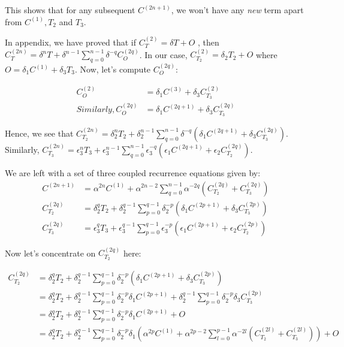 \documentclass[11pt,a4paper]{article}
\begin{document}
This shows that for any subsequent $C^{(2n+1)}$, we won't have any \textit{new} term apart from $C^{(1)},T_2$ and $T_3$. 

In appendix, we have proved that if $C^{(2)}_T=  \delta T + O$ , then $C^{(2n)}_T= \delta^{n} T +  \delta^{n-1} \sum_{q=0}^{n-1} \delta^{-q} C^{(2q)}_O  $. In our case,  $C^{(2)}_{T_2}=  \delta_2 T_2 + O $ where $O=\delta_1 C^{(1)} + \delta_3 T_3$. Now, let's compute $C^{(2q)}_O$:

\begin{align*}
C^{(2)}_O&=\delta_1 C^{(3)} + \delta_3  C^{(2)}_{T_3} \\
Similarly, C^{(2q)}_O&=\delta_1 C^{(2q+1)} + \delta_3  C^{(2q)}_{T_3} 
\end{align*}

Hence, we see that $C^{(2n)}_{T_2}= \delta_2^{n} T_2 +  \delta_2^{n-1} \sum_{q=0}^{n-1} \delta^{-q} (\delta_1 C^{(2q+1)} + \delta_3  C^{(2q)}_{T_3})  $. Similarly, $C^{(2n)}_{T_3}= \epsilon_3^{n} T_3 +  \epsilon_3^{n-1} \sum_{q=0}^{n-1}\epsilon_3^{-q} (\epsilon_1 C^{(2q+1)} + \epsilon_2  C^{(2q)}_{T_2})  $. 

We are left with a set of three coupled recurrence equations given by:
\begin{equation}
\boxed{
\begin{aligned}
C^{(2n+1)}&= \alpha^{2n} C^{(1)} +\alpha^{2n-2} \sum_{q=0}^{n-1} \alpha^{-2q} (C^{(2q)}_{T_2} + C^{(2q)}_{T_3}  ) \\
C^{(2q)}_{T_2} &= \delta^{q}_2 T_2 +  \delta_2^{q-1} \sum_{p=0}^{q-1} \delta_2^{-p}   (\delta_1 C^{(2p+1)} + \delta_3  C^{(2p)}_{T_3})\\
C^{(2q)}_{T_3} &= \epsilon_3^{q} T_3 +  \epsilon_3^{q-1} \sum_{p=0}^{q-1}\epsilon_3^{-p} (\epsilon_1 C^{(2p+1)} + \epsilon_2  C^{(2p)}_{T_2}) 
\end{aligned}
}
\end{equation}

Now let's concentrate on $C^{(2q)}_{T_2}$ here:

\begin{align}
C^{(2q)}_{T_2} &= \delta^{q}_2 T_2 +  \delta_2^{q-1} \sum_{p=0}^{q-1} \delta_2^{-p}   (\delta_1 C^{(2p+1)} + \delta_3  C^{(2p)}_{T_3})\\
 &= \delta^{q}_2 T_2 +  \delta_2^{q-1} \sum_{p=0}^{q-1} \delta_2^{-p}    \delta_1 C^{(2p+1)} + \delta_2^{q-1}  \sum_{p=0}^{q-1} \delta_2^{-p}  \delta_3  C^{(2p)}_{T_3}\\
 &= \delta^{q}_2 T_2 +  \delta_2^{q-1} \sum_{p=0}^{q-1} \delta_2^{-p}    \delta_1 C^{(2p+1)} + O\\
& =\delta^{q}_2 T_2 +  \delta_2^{q-1} \sum_{p=0}^{q-1} \delta_2^{-p}   \delta_1 ( \alpha^{2p} C^{(1)} +\alpha^{2p-2} \sum_{l=0}^{p-1} \alpha^{-2l} (C^{(2l)}_{T_2} + C^{(2l)}_{T_3})) + O 
\end{align}
\end{document}
